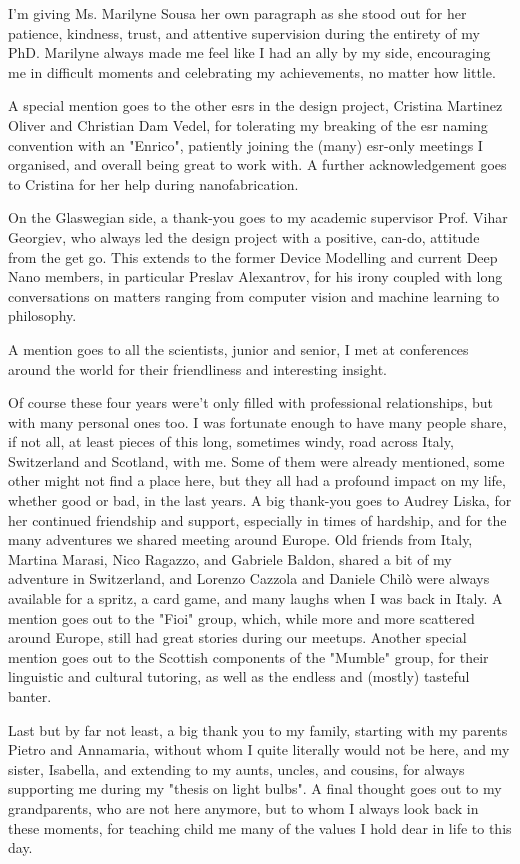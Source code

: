 I'm giving Ms. Marilyne Sousa her own paragraph as she stood out for her patience, kindness, trust, and attentive supervision during the entirety of my PhD. Marilyne always made me feel like I had an ally by my side, encouraging me in difficult moments and celebrating my achievements, no matter how little.

A special mention goes to the other \acs{esr}s in the \acs{design} project, Cristina Martinez Oliver and Christian Dam Vedel, for tolerating my breaking of the \acs{esr} naming convention with an "Enrico", patiently joining the (many) \acs{esr}-only meetings I organised, and overall being great to work with. A further acknowledgement goes to Cristina for her help during nanofabrication.

On the Glaswegian side, a thank-you goes to my academic supervisor Prof. Vihar Georgiev, who always led the \acs{design} project with a positive, can-do, attitude from the get go. This extends to the former Device Modelling and current Deep Nano members, in particular Preslav Alexantrov, for his irony coupled with long conversations on matters ranging from computer vision and machine learning to philosophy.

A mention goes to all the scientists, junior and senior, I met at conferences around the world for their friendliness and interesting insight.

Of course these four years were't only filled with professional relationships, but with many personal ones too. I was fortunate enough to have many people share, if not all, at least pieces of this long, sometimes windy, road across Italy, Switzerland and Scotland, with me. Some of them were already mentioned, some other might not find a place here, but they all had a profound impact on my life, whether good or bad, in the last years. A big thank-you goes to Audrey Liska, for her continued friendship and support, especially in times of hardship, and for the many adventures we shared meeting around Europe. Old friends from Italy, Martina Marasi, Nico Ragazzo, and Gabriele Baldon, shared a bit of my adventure in Switzerland, and Lorenzo Cazzola and Daniele Chilò were always available for a spritz, a card game, and many laughs when I was back in Italy. A mention goes out to the "Fioi" group, which, while more and more scattered around Europe, still had great stories during our meetups. Another special mention goes out to the Scottish components of the "Mumble" group, for their linguistic and cultural tutoring, as well as the endless and (mostly) tasteful banter.

Last but by far not least, a big thank you to my family, starting with my parents Pietro and Annamaria, without whom I quite literally would not be here, and my sister, Isabella, and extending to my aunts, uncles, and cousins, for always supporting me during my "thesis on light bulbs". A final thought goes out to my grandparents, who are not here anymore, but to whom I always look back in these moments, for teaching child me many of the values I hold dear in life to this day.